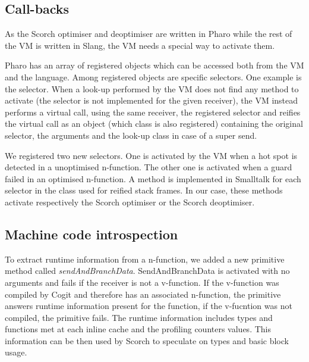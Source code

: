 \documentclass[a4paper,12pt,twoside]{../includes/ThesisStyle}
\begin{document}

\subsection{Call-backs}

As the Scorch optimiser and deoptimiser are written in Pharo while the rest of the VM is written in Slang, the VM needs a special way to activate them. 

Pharo has an array of registered objects which can be accessed both from the VM and the language. Among registered objects are specific selectors. One example is the  selector. When a look-up performed by the VM does not find any method to activate (the selector is not implemented for the given receiver), the VM instead performs a virtual call, using the same receiver, the registered  selector and reifies the virtual call as an object (which class is also registered) containing the original selector, the arguments and the look-up class in case of a super send. 

We registered two new selectors. One is activated by the VM when a hot spot is detected in a unoptimised n-function. The other one is activated when a guard failed in an optimised n-function. A method is implemented in Smalltalk for each selector in the class used for reified stack frames. In our case, these methods activate respectively the Scorch optimiser or the Scorch deoptimiser.

\subsection{Machine code introspection}

To extract runtime information from a n-function, we added a new primitive method called \emph{sendAndBranchData}. SendAndBranchData is activated with no arguments and fails if the receiver is not a v-function. If the v-function was compiled by Cogit and therefore has an associated n-function, the primitive answers runtime information present for the function, if the v-fucntion was not compiled, the primitive fails. The runtime information includes types and functions met at each inline cache and the profiling counters values. This information can be then used by Scorch to speculate on types and basic block usage. 
\end{document}
